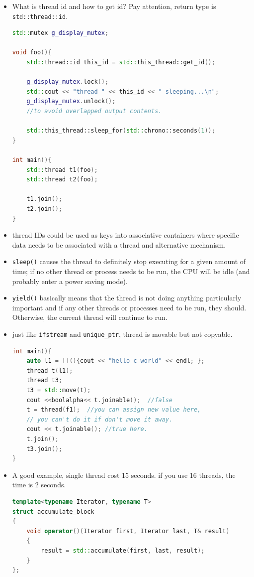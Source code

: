 \documentclass[a4paper,11pt,twoside]{book}
\begin{document}
\begin{itemize}
	\item What is thread id and how to get id? Pay attention, return type is \texttt{std::thread::id}.
\begin{lstlisting}[frame=single, language=c++]
std::mutex g_display_mutex;

void foo(){
	std::thread::id this_id = std::this_thread::get_id();
	
	g_display_mutex.lock();
	std::cout << "thread " << this_id << " sleeping...\n";
	g_display_mutex.unlock();
	//to avoid overlapped output contents.
	
	std::this_thread::sleep_for(std::chrono::seconds(1));
}

int main(){
	std::thread t1(foo);
	std::thread t2(foo);
	
	t1.join();
	t2.join();
}
\end{lstlisting}		
	
	\item thread IDs could be used as keys into associative containers where specific data needs to be associated with a thread and alternative mechanism.

    \item \texttt{sleep()} causes the thread to definitely stop executing for a given amount of time; if no other thread or process needs to be run, the CPU will be idle (and probably enter a power saving mode).
	
	\item \texttt{yield()} basically means that the thread is not doing anything particularly important and if any other threads or processes need to be run, they should. Otherwise, the current thread will continue to run.
	
	\item just like \texttt{ifstream} and \texttt{unique\_ptr}, thread is movable but not copyable. 
\begin{lstlisting}[frame=single, language=c++]
int main(){
	auto l1 = [](){cout << "hello c world" << endl; };
	thread t(l1);   
	thread t3;
	t3 = std::move(t);
	cout <<boolalpha<< t.joinable();  //false
	t = thread(f1);  //you can assign new value here,
	// you can't do it if don't move it away.
	cout << t.joinable(); //true here.
	t.join();
	t3.join();
}	
\end{lstlisting}	
	
	\item A good example, single thread cost 15 seconds. if you use 16 threads, the time is 2 seconds.
\begin{lstlisting}[frame=single, language=c++]
template<typename Iterator, typename T>
struct accumulate_block
{
	void operator()(Iterator first, Iterator last, T& result)
	{
		result = std::accumulate(first, last, result);
	}
};


\end{lstlisting}
\end{itemize}
\end{document}
